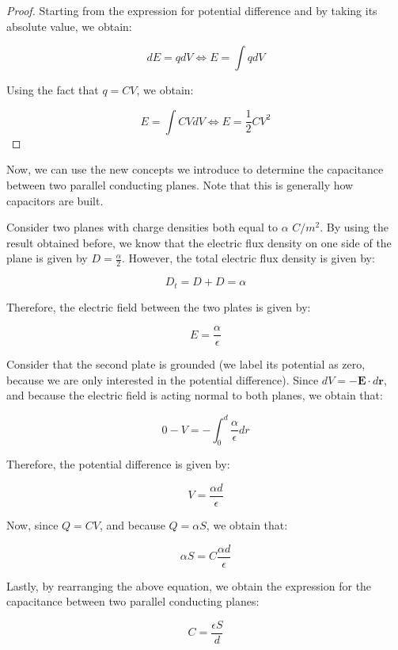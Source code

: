 \documentclass{article}
\begin{document}
\begin{proof}
    Starting from the expression for potential difference and by taking its absolute value, we obtain:

    \[ dE = qdV \iff E = \int qdV \]

    Using the fact that $q = CV$, we obtain:

    \[ E = \int CVdV \iff E = \frac{1}{2}CV^2 \]
\end{proof}

Now, we can use the new concepts we introduce to determine the capacitance between two parallel conducting planes. Note that this is generally how capacitors are built.

\begin{example}
    Consider two planes with charge densities both equal to $\alpha$ $C/m^2$. By using the result obtained before, we know that the electric flux density on one side of the plane is given by $D = \frac{\alpha}{2}$. However, the total electric flux density is given by:

    \[ D_t = D + D = \alpha \]

    Therefore, the electric field between the two plates is given by:

    \[ E = \frac{\alpha}{\epsilon} \]

    Consider that the second plate is grounded (we label its potential as zero, because we are only interested in the potential difference). Since $dV = - \mathbf{E} \cdot d\mathbf{r}$, and because the electric field is acting normal to both planes, we obtain that:

    \[ 0 - V = -\int_0^d \frac{\alpha}{\epsilon} dr \]

    Therefore, the potential difference is given by:

    \[ V = \frac{\alpha d}{\epsilon} \]

    Now, since $Q = CV$, and because $Q = \alpha S$, we obtain that:

    \[ \alpha S = C \frac{\alpha d}{\epsilon} \]

    Lastly, by rearranging the above equation, we obtain the expression for the capacitance between two parallel conducting planes:

    \[ C = \frac{\epsilon S}{d} \]
\end{example}
\end{document}
